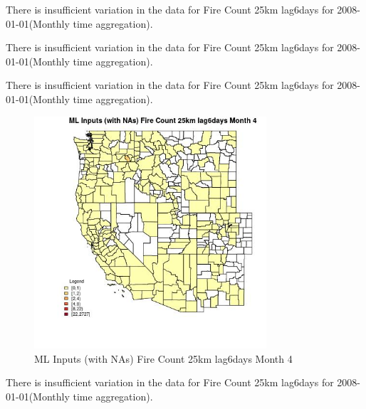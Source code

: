 There is insufficient variation in the data for Fire Count 25km lag6days for 2008-01-01(Monthly time aggregation). 
 

There is insufficient variation in the data for Fire Count 25km lag6days for 2008-01-01(Monthly time aggregation). 
 

There is insufficient variation in the data for Fire Count 25km lag6days for 2008-01-01(Monthly time aggregation). 
 

\begin{figure} 
\centering  
\includegraphics[width=0.77\textwidth]{Code_Outputs/Report_ML_input_PM25_Step4_part_f_de_duplicated_aveswNAs_CountyFire_Count_25km_lag6daysmedianMonth4.jpg} 
\caption{\label{fig:Report_ML_input_PM25_Step4_part_f_de_duplicated_aveswNAsCountyFire_Count_25km_lag6daysmedianMonth4}ML Inputs (with NAs) Fire Count 25km lag6days Month 4} 
\end{figure} 
 

There is insufficient variation in the data for Fire Count 25km lag6days for 2008-01-01(Monthly time aggregation). 
 

